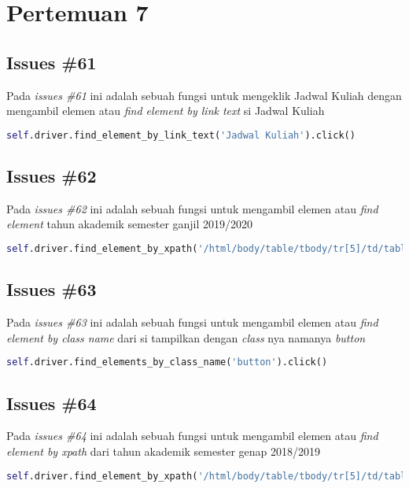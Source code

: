 \chapter{Pertemuan 7}

\section{Issues \#61}
Pada \textit{issues \#61} ini adalah sebuah fungsi untuk mengeklik  Jadwal Kuliah dengan mengambil elemen atau \textit{find element by link text} si Jadwal Kuliah
\begin{lstlisting}[language=Python]
	self.driver.find_element_by_link_text('Jadwal Kuliah').click()
\end{lstlisting}

\section{Issues \#62}
Pada \textit{issues \#62} ini adalah sebuah fungsi untuk mengambil elemen atau \textit{find element} tahun akademik semester ganjil 2019/2020
\begin{lstlisting}[language=Python]
	  self.driver.find_element_by_xpath('/html/body/table/tbody/tr[5]/td/table[3]/tbody/tr[1]/td[2]/p[1]/table/tbody/tr/td[3]/select/option[2]').click()
\end{lstlisting}

\section{Issues \#63}
Pada \textit{issues \#63} ini adalah sebuah fungsi untuk mengambil elemen atau \textit{find element by class name} dari si tampilkan dengan \textit{class} nya namanya \textit{button}
\begin{lstlisting}[language=Python]
self.driver.find_elements_by_class_name('button').click()
\end{lstlisting}


\section{Issues \#64}
Pada \textit{issues \#64} ini adalah sebuah fungsi untuk mengambil elemen atau \textit{find element by xpath} dari tahun akademik semester genap 2018/2019
\begin{lstlisting}[language=Python]
self.driver.find_element_by_xpath('/html/body/table/tbody/tr[5]/td/table[3]/tbody/tr[1]/td[2]/p[1]/table/tbody/tr/td[3]/select/option[3]').click()
\end{lstlisting}

